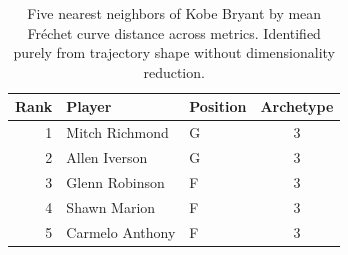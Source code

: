 \begin{table}[htbp]
  \centering\small
  \begin{tabular}{rllc}
    \toprule
    Rank & Player & Position & Archetype \\
    \midrule
    1 & Mitch Richmond & G & 3 \\
    2 & Allen Iverson & G & 3 \\
    3 & Glenn Robinson & F & 3 \\
    4 & Shawn Marion & F & 3 \\
    5 & Carmelo Anthony & F & 3 \\
    \bottomrule
  \end{tabular}
  \caption{Five nearest neighbors of Kobe Bryant by mean Fr\'{e}chet curve distance across metrics. Identified purely from trajectory shape without dimensionality reduction.}
  \label{tab:Kobe_Bryant_frechet_curve_neighbors}
\end{table}

